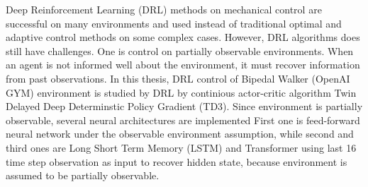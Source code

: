 Deep Reinforcement Learning (DRL) methods on mechanical control are successful on many environments and used instead of traditional optimal and adaptive control methods on some complex cases. However, DRL algorithms does still have challenges. One is control on partially observable environments. When an agent is not informed well about the environment, it must recover information from past observations. In this thesis, DRL control of Bipedal Walker (OpenAI GYM) environment is studied by DRL by continious actor-critic algorithm Twin Delayed Deep Determinstic Policy Gradient (TD3). Since environment is partially observable, several neural architectures are implemented First one is feed-forward neural network under the observable environment assumption, while second and third ones are Long Short Term Memory (LSTM) and Transformer using last 16 time step observation as input to recover hidden state, because environment is assumed to be partially observable.






